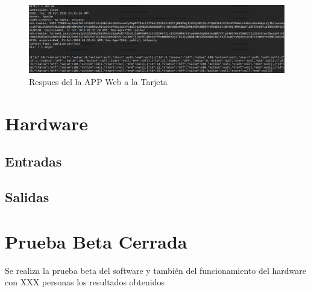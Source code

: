 \begin{figure}[H]
	\centering
	\caption{Respues del la APP Web a la Tarjeta}
	\label{fig:httprqstesp}
	\includegraphics[width=0.8\linewidth]{Imagenes/HTTPRqstesp}
\end{figure}


\section{Hardware}

\subsection{Entradas}
\subsection{Salidas}

\section{Prueba Beta Cerrada}

Se realiza la prueba beta del software y también del funcionamiento del hardware con XXX personas los resultados obtenidos 